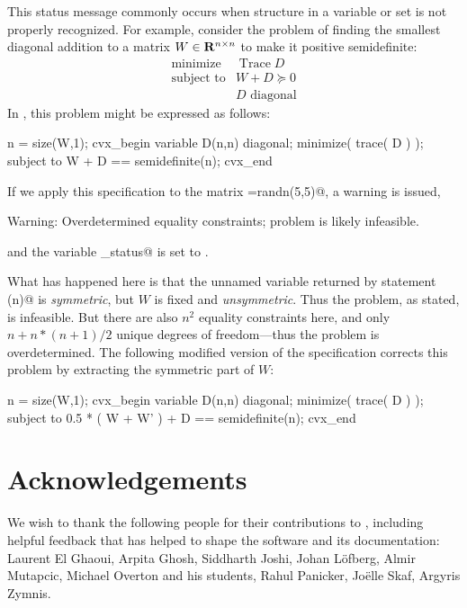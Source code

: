 \documentclass[12pt]{article}
\begin{document}
This status message \verb@Overdetermined@ commonly occurs when structure
in a variable or set is not properly recognized. For example, consider the problem
of finding the smallest diagonal addition to a matrix $W\in\mathbf{R}^{{n}\times{n}}$ to make it positive semidefinite:
\begin{equation}
	\begin{array}{ll}
		\text{minimize} & \mathop{\text{Trace}} D \\
		\text{subject to} & W + D \succeq 0 \\
		                  & D \text{~diagonal}
	\end{array}
\end{equation}
In \cvx, this problem might be expressed as follows:
\begin{code}
	n = size(W,1);
	cvx_begin
	    variable D(n,n) diagonal;
	    minimize( trace( D ) );
	    subject to
	        W + D == semidefinite(n);
	cvx_end
\end{code}
If we apply this specification to the matrix \verb@W=randn(5,5)@, a warning is issued,
\begin{code}
	Warning: Overdetermined equality constraints;
	    problem is likely infeasible.
\end{code}
and the variable \verb@cvx_status@ is set to \verb@Overdetermined@. 

What has happened here
is that the unnamed variable returned by statement \verb@semidefinite(n)@ is \emph{symmetric}, but
$W$ is fixed and \emph{unsymmetric}. Thus the problem, as stated, is infeasible. But
there are also $n^2$ equality constraints here, and only $n+n*(n+1)/2$ unique degrees
of freedom---thus the problem is overdetermined. The following modified 
version of the specification corrects this problem by extracting the symmetric part of $W$:
\begin{code}
	n = size(W,1);
	cvx_begin
	    variable D(n,n) diagonal;
	    minimize( trace( D ) );
	    subject to
	        0.5 * ( W + W' ) + D == semidefinite(n);
	cvx_end
\end{code}

\section{Acknowledgements}

We wish to thank the following people for their contributions to
\cvx, including helpful feedback that has helped to shape the 
software and its documentation:  Laurent El Ghaoui, Arpita Ghosh, 
Siddharth Joshi, Johan L\"{o}fberg, Almir Mutapcic, Michael Overton
and his students, Rahul Panicker, Jo\"{e}lle Skaf, Argyris Zymnis.

\newpage

\newpage
\end{document}
